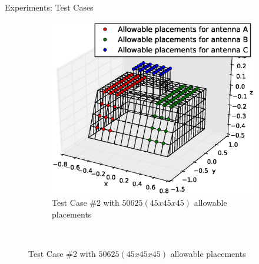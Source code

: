 \documentclass{beamer}
\begin{document}
\begin{frame}{Experiments: Test Cases}
\begin{figure}
\begin{subfigure}{.5\columnwidth}
            \includegraphics[width=\columnwidth, height=\columnwidth]{../paper/FIG/tc2_figure}%
            \caption*{\tiny Test Case \#2 with $50625 (45x45x45)$ allowable placements}%
        \end{subfigure}\hfill\\%
    \end{figure}
\end{frame}
\end{document}
